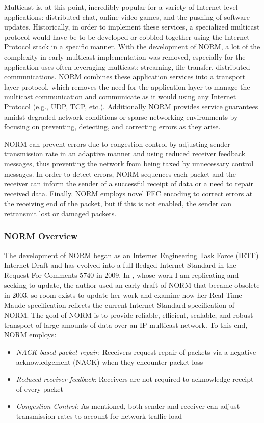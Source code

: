 \documentclass[10pt, journal]{IEEEtran}
\begin{document}
Multicast is, at this point, incredibly popular for a variety of Internet level applications: distributed chat, online video games, and the pushing of software updates. Historically, in order to implement these services, a specialized multicast protocol would have be to be developed or cobbled together using the Internet Protocol stack in a specific manner. With the development of NORM, a lot of the complexity in early multicast implementation was removed, especially for the application uses often leveraging multicast: streaming, file transfer, distributed communications. NORM \cite{rfc5740} combines these application services into a transport layer protocol, which removes the need for the application layer to manage the multicast communication and communicate as it would using any Internet Protocol (e.g., UDP, TCP, etc.). Additionally NORM provides service guarantees amidst degraded network conditions or sparse networking environments by focusing on preventing, detecting, and correcting errors as they arise.

NORM can prevent errors due to congestion control by adjusting sender transmission rate in an adaptive manner and using reduced receiver feedback messages, thus preventing the network from being taxed by unnecessary control messages. In order to detect errors, NORM sequences each packet and the receiver can inform the sender of a successful receipt of data or a need to repair received data. Finally, NORM employs novel FEC encoding to correct errors at the receiving end of the packet, but if this is not enabled, the sender can retransmit lost or damaged packets.

\subsubsection{NORM Overview}
The development of NORM began as an Internet Engineering Task Force (IETF) Internet-Draft and has evolved into a full-fledged Internet Standard in the Request For Comments 5740 \cite{rfc5740} in 2009. In \cite{Lien2004}, whose work I am replicating and seeking to update, the author used an early draft of NORM that became obsolete in 2003, so room exists to update her work and examine how her Real-Time Maude specification reflects the current Internet Standard specification of NORM. The goal of NORM is to provide reliable, efficient, scalable, and robust transport of large amounts of data over an IP multicast network. To this end, NORM employs:
\begin{itemize}
	\item \textit{NACK based packet repair}: Receivers request repair of packets via a negative-acknowledgement (NACK) when they encounter packet loss
	\item \textit{Reduced receiver feedback}: Receivers are not required to acknowledge receipt of every packet
	\item \textit{Congestion Control}: As mentioned, both sender and receiver can adjust transmission rates to account for network traffic load
\end{itemize}
\end{document}
